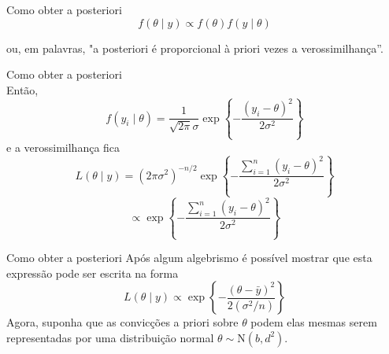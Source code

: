 \documentclass{beamer}
\theoremstyle{definition}
\begin{document}
\begin{frame}{Como obter a posteriori}
    \begin{equation}
        f(\theta \mid y) \propto f(\theta) f(y \mid \theta)
    \end{equation}
    
ou, em palavras, "a posteriori é proporcional à priori vezes a verossimilhança”.
\end{frame}
\begin{frame}{Como obter a posteriori}
\\
Então,
\begin{equation}
  f\left(y_i \mid \theta\right)=\frac{1}{\sqrt{2 \pi} \sigma} \exp \left\{-\frac{\left(y_i-\theta\right)^2}{2 \sigma^2}\right\}
\end{equation}
e a verossimilhança fica
\begin{equation}
  L(\theta \mid y) =\left(2 \pi \sigma^2\right)^{-n / 2} \exp \left\{-\frac{\sum_{i=1}^n\left(y_i-\theta\right)^2}{2 \sigma^2}\right\}
  \end{equation}
  $$\propto \exp \left\{-\frac{\sum_{i=1}^n\left(y_i-\theta\right)^2}{2 \sigma^2}\right\}$$
\end{frame}


\begin{frame}{Como obter a posteriori}
   Após algum algebrismo é possível mostrar que esta expressão pode ser escrita na
forma
\begin{equation}
    L(\theta \mid y) \propto \exp \left\{-\frac{(\theta-\bar{y})^2}{2\left(\sigma^2 / n\right)}\right\}
\end{equation}
Agora, suponha que as convicções a priori sobre $\theta$ podem elas mesmas serem representadas por uma distribuição normal $\theta \sim \mathrm{N}\left(b, d^2\right)$.
\end{frame}
\end{document}
